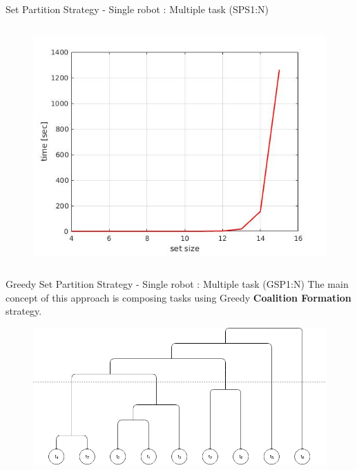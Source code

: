 \begin{frame}[fragile]{Set Partition Strategy - Single robot : Multiple task (SPS1:N)}
\begin{columns}
\begin{column}{.4\textwidth}
\begin{figure}
                \includegraphics[width=\textwidth]{img/exp}
            \end{figure}
            \end{column}
        \end{columns}
    \end{frame}

    \begin{frame}[fragile]{Greedy Set Partition Strategy - Single robot : Multiple task (GSP1:N)}
        The main concept of this approach is composing tasks using Greedy {\bf Coalition Formation} strategy.
        \begin{figure}[hbt]
            \centering
            \includegraphics[width=\textwidth]{img/SP.png}
        \end{figure}
    \end{frame}

